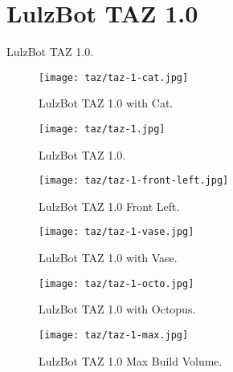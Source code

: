 %
%
%
%
%

\section{LulzBot TAZ 1.0}
LulzBot TAZ 1.0.

\begin{figure}[h!]
\texttt{[image: taz/taz-1-cat.jpg]}
 \caption{LulzBot TAZ 1.0 with Cat.}
 \label{fig:taz-1-cat}
\end{figure}

\begin{figure}[h!]
\texttt{[image: taz/taz-1.jpg]}
 \caption{LulzBot TAZ 1.0.}
 \label{fig:taz-1}
\end{figure}

\begin{figure}[h!]
\texttt{[image: taz/taz-1-front-left.jpg]}
 \caption{LulzBot TAZ 1.0 Front Left.}
 \label{fig:taz-1-front-left}
\end{figure}

\begin{figure}[h!]
\texttt{[image: taz/taz-1-vase.jpg]}
 \caption{LulzBot TAZ 1.0 with Vase.}
 \label{fig:taz-1-vase}
\end{figure}

\begin{figure}[h!]
\texttt{[image: taz/taz-1-octo.jpg]}
 \caption{LulzBot TAZ 1.0 with Octopus.}
 \label{fig:taz-1-octo}
\end{figure}

\begin{figure}[h!]
\texttt{[image: taz/taz-1-max.jpg]}
 \caption{LulzBot TAZ 1.0 Max Build Volume.}
 \label{fig:taz-1-max}
\end{figure}
